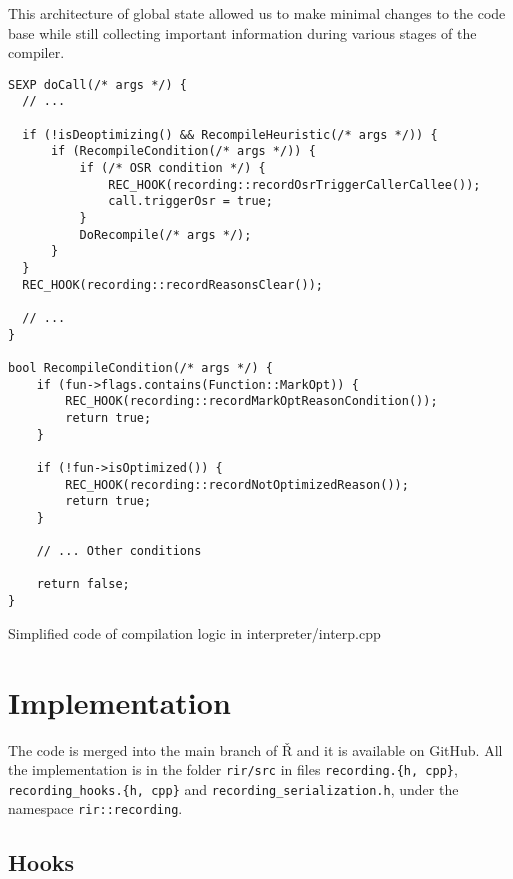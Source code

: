 This architecture of global state allowed us to make minimal changes to the code base while still collecting important information during various stages of the compiler.

\begin{listing}
	\centering
	\begin{verbatim}
SEXP doCall(/* args */) {
  // ...

  if (!isDeoptimizing() && RecompileHeuristic(/* args */)) {
      if (RecompileCondition(/* args */)) {
          if (/* OSR condition */) {
              REC_HOOK(recording::recordOsrTriggerCallerCallee());
              call.triggerOsr = true;
          }
          DoRecompile(/* args */);
      }
  }
  REC_HOOK(recording::recordReasonsClear());

  // ...
}

bool RecompileCondition(/* args */) {
    if (fun->flags.contains(Function::MarkOpt)) {
        REC_HOOK(recording::recordMarkOptReasonCondition());
        return true;
    }

    if (!fun->isOptimized()) {
        REC_HOOK(recording::recordNotOptimizedReason());
        return true;
    }

    // ... Other conditions

    return false;
}
  \end{verbatim}
	\caption{Simplified code of compilation logic in interpreter/interp.cpp}\label{lst:hook-docall}
\end{listing}

\section{Implementation}

The code is merged into the main branch of Ř and it is available on GitHub\cite{rsh-github}. All the implementation is in the folder \texttt{rir/src} in files \texttt{recording.\{h, cpp\}}, \texttt{recording\_hooks.\{h, cpp\}} and \texttt{recording\_serialization.h}, under the name\-space \texttt{rir::recording}.

\subsection{Hooks}

